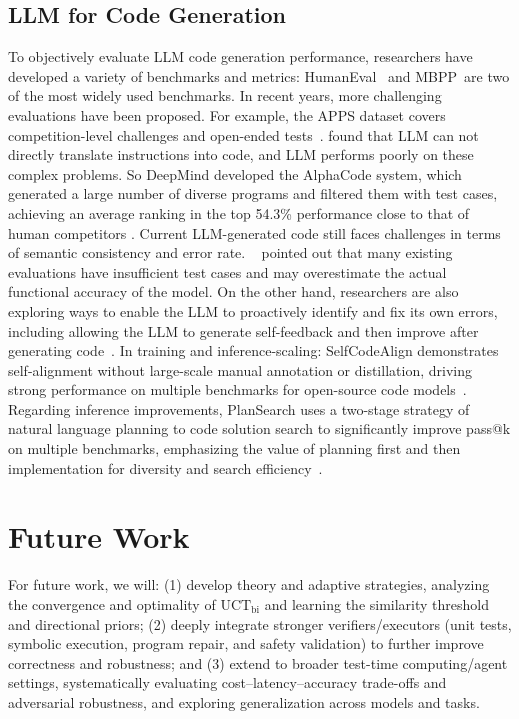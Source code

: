 \documentclass[11pt]{article}
\theoremstyle{definition}
\theoremstyle{remark}
\begin{document}
\subsection{LLM for Code Generation}
To objectively evaluate LLM code generation performance, researchers have developed a variety of benchmarks and metrics: HumanEval~\citep{chen2021evaluating} and MBPP~\citep{austin2021program}are two of the most widely used benchmarks. In recent years, more challenging evaluations have been proposed. For example, the APPS dataset covers competition-level challenges and open-ended tests~\citep{hendrycks2021measuring}. \cite{hendrycks2021measuring} found that LLM can not directly translate instructions into code, and LLM performs poorly on these complex problems. So DeepMind developed the AlphaCode system, which generated a large number of diverse programs and filtered them with test cases, achieving an average ranking in the top 54.3\%  performance close to that of human competitors \citep{li2022competition}. Current LLM-generated code still faces challenges in terms of semantic consistency and error rate. ~\cite{liu2023is} pointed out that many existing evaluations have insufficient test cases and may overestimate the actual functional accuracy of the model. On the other hand, researchers are also exploring ways to enable the LLM to proactively identify and fix its own errors, including allowing the LLM to generate self-feedback and then improve after generating code~\citep{madaan2023selfrefine}. In training and inference-scaling: SelfCodeAlign demonstrates self-alignment without large-scale manual annotation or distillation, driving strong performance on multiple benchmarks for open-source code models~\cite{weiselfcodealign}. Regarding inference improvements, PlanSearch uses a two-stage strategy of natural language planning to code solution search to significantly improve pass@k on multiple benchmarks, emphasizing the value of planning first and then implementation for diversity and search efficiency~\citep{wang2025planning}.


\section{Future Work}
For future work, we will: (1) develop theory and adaptive strategies, analyzing the convergence and optimality of $\mathrm{UCT}_{\text{bi}}$ and learning the similarity threshold and directional priors; (2) deeply integrate stronger verifiers/executors (unit tests, symbolic execution, program repair, and safety validation) to further improve correctness and robustness; and (3) extend to broader test-time computing/agent settings, systematically evaluating cost--latency--accuracy trade-offs and adversarial robustness, and exploring generalization across models and tasks.
\end{document}
